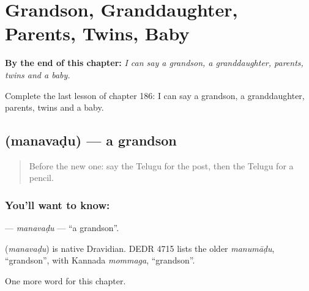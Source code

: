 
\chapter{Grandson, Granddaughter, Parents, Twins, Baby}
\label{ch:te-grandson-granddaughter-parents-twins-baby}

\begin{chapteropening}
\textbf{By the end of this chapter:} \emph{I can say a grandson, a granddaughter, parents, twins and a baby.}

Complete the last lesson of chapter 186: I can say a grandson, a granddaughter, parents, twins and a baby.
\end{chapteropening}

\section[\texorpdfstring{\te{మనవడు} (manavaḍu)}{మనవడు (manavaḍu)}]{ (manavaḍu) — a grandson}

\label{lesson:TE-C186-manavadu}



\begin{quote}
Before the new one: say the Telugu for the post, then the Telugu for a pencil.
\end{quote}

\subsection*{You'll want to know: }
\textbf{} — \emph{manavaḍu} — \textquotedblleft{}a grandson\textquotedblright{}.

\begin{cousinweb}
\textbf{} (\emph{manavaḍu}) is native Dravidian. DEDR 4715 lists the older \emph{manumāḍu}, \textquotedblleft{}grandson\textquotedblright{}, with Kannada \emph{mommaga}, \textquotedblleft{}grandson\textquotedblright{}.
\end{cousinweb}

\begin{grammarlens}[title={What you've built}]
One more word for this chapter.
\end{grammarlens}

